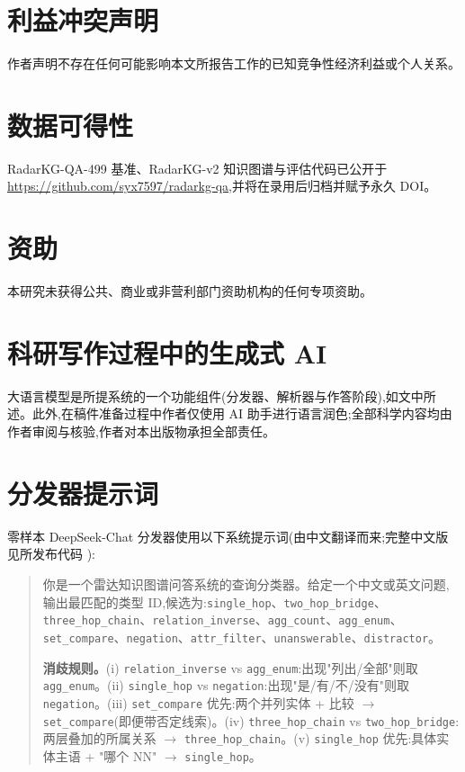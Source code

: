 \documentclass[11pt,a4paper]{article}
\begin{document}
\section*{利益冲突声明}
作者声明不存在任何可能影响本文所报告工作的已知竞争性经济利益或个人关系。

\section*{数据可得性}
RadarKG-QA-499 基准、RadarKG-v2 知识图谱与评估代码已公开于 \url{https://github.com/syx7597/radarkg-qa},并将在录用后归档并赋予永久 DOI。

\section*{资助}
本研究未获得公共、商业或非营利部门资助机构的任何专项资助。

\section*{科研写作过程中的生成式 AI}
大语言模型是所提系统的一个功能组件(分发器、解析器与作答阶段),如文中所述。此外,在稿件准备过程中作者仅使用 AI 助手进行语言润色;全部科学内容均由作者审阅与核验,作者对本出版物承担全部责任。




\appendix
\section{分发器提示词}
\label{app:dispatcher}

零样本 DeepSeek-Chat 分发器使用以下系统提示词(由中文翻译而来;完整中文版见所发布代码 ):

\begin{quote}\small
你是一个雷达知识图谱问答系统的查询分类器。给定一个中文或英文问题,输出最匹配的类型 ID,候选为:\texttt{single\_hop}、\texttt{two\_hop\_bridge}、\texttt{three\_hop\_chain}、\texttt{relation\_inverse}、\texttt{agg\_count}、\texttt{agg\_enum}、\texttt{set\_compare}、\texttt{negation}、\texttt{attr\_filter}、\texttt{unanswerable}、\texttt{distractor}。

\textbf{消歧规则。}(i) \texttt{relation\_inverse} vs \texttt{agg\_enum}:出现"列出/全部"则取 \texttt{agg\_enum}。(ii) \texttt{single\_hop} vs \texttt{negation}:出现"是/有/不/没有"则取 \texttt{negation}。(iii) \texttt{set\_compare} 优先:两个并列实体 + 比较 $\to$ \texttt{set\_compare}(即便带否定线索)。(iv) \texttt{three\_hop\_chain} vs \texttt{two\_hop\_bridge}:两层叠加的所属关系 $\to$ \texttt{three\_hop\_chain}。(v) \texttt{single\_hop} 优先:具体实体主语 + "哪个 NN" $\to$ \texttt{single\_hop}。
\end{quote}
\end{document}
